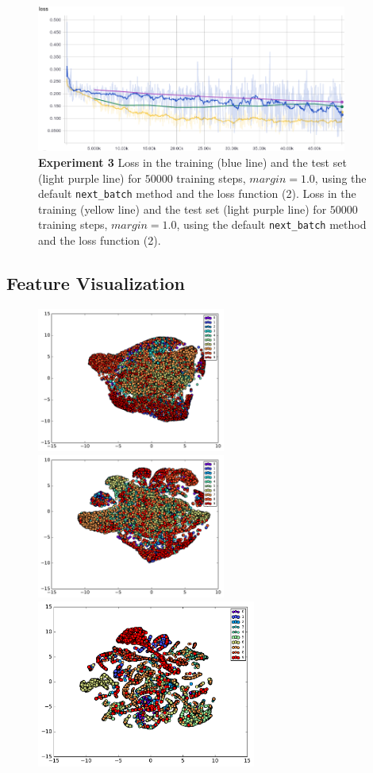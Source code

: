 \documentclass{article}
\begin{document}
\begin{figure}[h!]
\centering
\includegraphics[width=10.2cm]{siamese-2.png}
\caption{\textbf{Experiment 3} Loss in the training (blue line) and the test set (light purple line) for $50000$ training steps, $margin = 1.0$, using the default \texttt{next\_batch} method and the loss function (2).
Loss in the training (yellow line) and the test set (light purple line) for $50000$ training steps, $margin = 1.0$, using the default \texttt{next\_batch} method and the loss function (2).}
\label{fig:siamese-2}
\end{figure}




\subsection{Feature Visualization}

\begin{figure}[h!]
\centering
\includegraphics[width=6.2cm]{visualization-siamese-plain.pdf}
\includegraphics[width=6.2cm]{visualization-siamese-1.pdf}
\includegraphics[width=7.2cm]{visualization-siamese-3.pdf}
\caption{}
\label{fig:features}
\end{figure}
\end{document}
